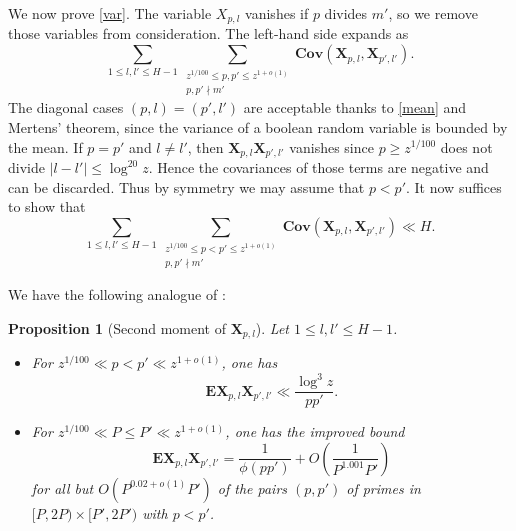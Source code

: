 \documentclass[12pt]{amsart}
\newtheorem{proposition}[theorem]{Proposition}
\newcommand{\E}{\mathbf{E}}
\newcommand{\Cov}{\mathbf{Cov}}
\begin{document}
We now prove \eqref{var}.  The variable $X_{p,l}$ vanishes if $p$ divides $m'$, so we remove those variables from consideration. The left-hand side expands as
$$
\sum_{1 \leq l,l' \leq H-1} \sum_{\substack{z^{1/100}\leq p,p' \leq z^{1+o(1)} \\ p,p' \nmid m'}} \Cov \left( \mathbf{X}_{p,l}, \mathbf{X}_{p',l'} \right).
$$
The diagonal cases $(p,l) = (p',l')$ are acceptable thanks to \eqref{mean} and Mertens' theorem, since the variance of a boolean random variable is bounded by the mean.  If $p=p'$ and $l \neq l'$, then $\mathbf{X}_{p,l} \mathbf{X}_{p',l'}$ vanishes since $p \geq z^{1/100}$ does not divide $|l-l'| \leq \log^{20} z$.  Hence the covariances of those terms are negative and can be discarded. Thus by symmetry we may assume that $p < p'$. It now suffices to show that
\begin{equation}\label{pout}
\sum_{1 \leq l,l' \leq H-1} \sum_{\substack{z^{1/100} \leq p < p' \leq z^{1+o(1)} \\ p, p' \nmid m'}} \Cov \left( \mathbf{X}_{p,l}, \mathbf{X}_{p',l'} \right) \ll H.
\end{equation}

We have the following analogue of :

\begin{proposition}[Second moment of $\mathbf{X}_{p,l}$]\label{prop-second} Let $1 \leq l,l' \leq H-1$.
\begin{itemize}
    \item[(i)] For $z^{1/100} \ll p < p' \ll z^{1+o(1)}$, one has
\begin{equation}\label{cortriv}
 \E \mathbf{X}_{p,l} \mathbf{X}_{p',l'} \ll \frac{\log^3 z}{p p'}.
\end{equation}
    \item[(ii)] For $z^{1/100} \ll P \leq P' \ll z^{1+o(1)}$, one has the improved bound
\begin{equation}\label{lop}
    \E \mathbf{X}_{p,l} \mathbf{X}_{p',l'} = \frac{1}{\phi(pp')} + O\left(\frac{1}{P^{1.001} P'}\right)
\end{equation}
for all but $O(P^{0.02+o(1)} P')$ of the pairs $(p,p')$ of primes in $[P,2P) \times [P', 2P')$ with $p < p'$.
\end{itemize}
\end{proposition}
\end{document}
